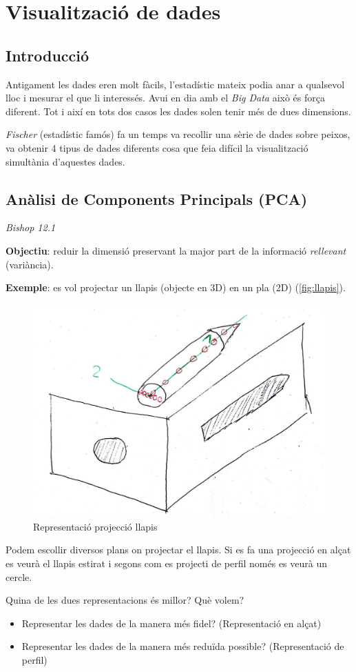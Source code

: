 \chapter{Visualització de dades}
\section{Introducció}

Antigament les dades eren molt fàcils, l'estadístic mateix podia anar a qualsevol lloc i mesurar el que li interessés. Avui en dia amb el \emph{Big Data} això és força diferent. Tot i així en tots dos casos les dades solen tenir més de dues dimensions. 

\emph{Fischer} (estadístic famós) fa un temps va recollir una sèrie de dades sobre peixos, va obtenir 4 tipus de dades diferents cosa que feia difícil la visualització simultània d'aquestes dades.

\section{Anàlisi de Components Principals (PCA)}
\textit{Bishop 12.1}

\textbf{Objectiu}: reduir la dimensió preservant la major part de la informació \emph{rellevant} (variància). 

\textbf{Exemple}: es vol projectar un llapis (objecte en 3D) en un pla (2D) (\autoref{fig:llapis}).

\begin{figure}[h!]
	\centering
	\includegraphics[width=0.5\linewidth]{tema_2/images/llapis.jpg}
	\caption{Representació projecció llapis}
	\label{fig:llapis}
\end{figure}

Podem escollir diversos plans on projectar el llapis. Si es fa una projecció en alçat es veurà el llapis estirat i segons com es projecti de perfil només es veurà un cercle.

Quina de les dues representacions és millor? Què volem? 
\begin{itemize}
	\item Representar les dades de la manera més fidel? (Representació en alçat)
	\item Representar les dades de la manera més reduïda possible? (Representació de perfil)
\end{itemize}

